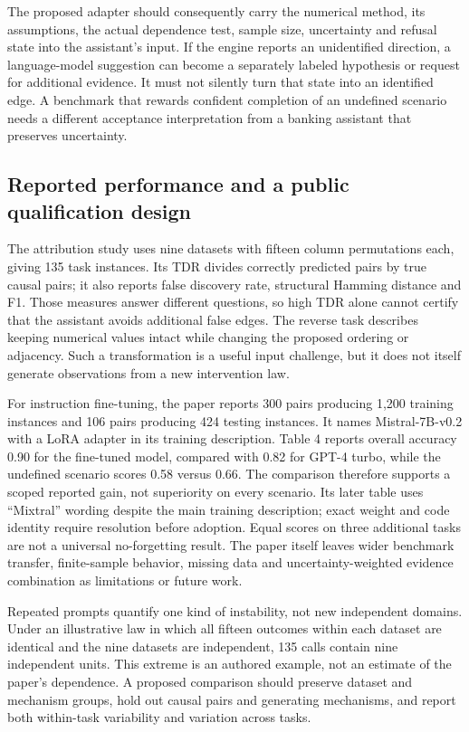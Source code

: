 The proposed adapter should consequently carry the numerical method, its
assumptions, the actual dependence test, sample size, uncertainty and refusal
state into the assistant's input. If the engine reports an unidentified
direction, a language-model suggestion can become a separately labeled
hypothesis or request for additional evidence. It must not silently turn that
state into an identified edge. A benchmark that rewards confident completion
of an undefined scenario needs a different acceptance interpretation from a
banking assistant that preserves uncertainty.

\subsection{Reported performance and a public qualification design}
\label{exec20:pa-design}
The attribution study uses nine datasets with fifteen column permutations
each, giving 135 task instances. Its TDR divides correctly predicted pairs by
true causal pairs; it also reports false discovery rate, structural Hamming
distance and F1. Those measures answer different questions, so high TDR alone
cannot certify that the assistant avoids additional false edges. The reverse
task describes keeping numerical values intact while changing the proposed
ordering or adjacency. Such a transformation is a useful input challenge,
but it does not itself generate observations from a new intervention law.
\citep{exec20_attribution}

For instruction fine-tuning, the paper reports 300 pairs producing 1,200
training instances and 106 pairs producing 424 testing instances. It names
Mistral-7B-v0.2 with a LoRA adapter in its training description. Table 4 reports
overall accuracy 0.90 for the fine-tuned model, compared with 0.82 for
GPT-4 turbo, while the undefined scenario scores 0.58 versus 0.66. The
comparison therefore supports a scoped reported gain, not superiority on
every scenario. Its later table uses ``Mixtral'' wording despite the main
training description; exact weight and code identity require resolution
before adoption. Equal scores on three additional tasks are not a universal
no-forgetting result. The paper itself leaves wider benchmark transfer,
finite-sample behavior, missing data and uncertainty-weighted evidence
combination as limitations or future work.~\citep{exec20_attribution}

Repeated prompts quantify one kind of instability, not new independent
domains. Under an illustrative law in which all fifteen outcomes within each
dataset are identical and the nine datasets are independent, 135 calls contain
nine independent units. This extreme is an authored example, not an estimate
of the paper's dependence. A proposed comparison should preserve dataset and
mechanism groups, hold out causal pairs and generating mechanisms, and report
both within-task variability and variation across tasks.
\citep{exec20_population_attribution_reference}

